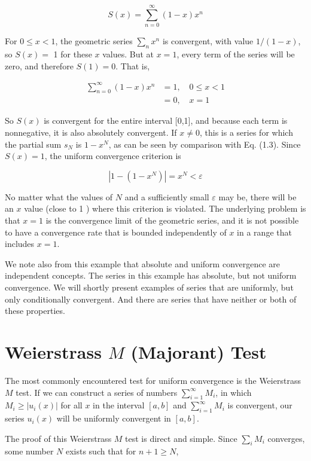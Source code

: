 \documentclass[10pt]{article}
\begin{document}
$$
S(x)=\sum_{n=0}^{\infty}(1-x) x^{n}
$$

For $0 \leq x<1$, the geometric series $\sum_{n} x^{n}$ is convergent, with value $1 /(1-x)$, so $S(x)=$ 1 for these $x$ values. But at $x=1$, every term of the series will be zero, and therefore $S(1)=0$. That is,


\begin{align*}
\sum_{n=0}^{\infty}(1-x) x^{n} & =1, \quad 0 \leq x<1 \\
& =0, \quad x=1 \tag{1.35}
\end{align*}


So $S(x)$ is convergent for the entire interval [0,1], and because each term is nonnegative, it is also absolutely convergent. If $x \neq 0$, this is a series for which the partial sum $s_{N}$ is $1-x^{N}$, as can be seen by comparison with Eq. (1.3). Since $S(x)=1$, the uniform convergence criterion is

$$
\left|1-\left(1-x^{N}\right)\right|=x^{N}<\varepsilon
$$

No matter what the values of $N$ and a sufficiently small $\varepsilon$ may be, there will be an $x$ value (close to 1 ) where this criterion is violated. The underlying problem is that $x=1$ is the convergence limit of the geometric series, and it is not possible to have a convergence rate that is bounded independently of $x$ in a range that includes $x=1$.

We note also from this example that absolute and uniform convergence are independent concepts. The series in this example has absolute, but not uniform convergence. We will shortly present examples of series that are uniformly, but only conditionally convergent. And there are series that have neither or both of these properties.

\section*{Weierstrass $M$ (Majorant) Test}
The most commonly encountered test for uniform convergence is the Weierstrass $M$ test. If we can construct a series of numbers $\sum_{i=1}^{\infty} M_{i}$, in which $M_{i} \geq\left|u_{i}(x)\right|$ for all $x$ in the interval $[a, b]$ and $\sum_{i=1}^{\infty} M_{i}$ is convergent, our series $u_{i}(x)$ will be uniformly convergent in $[a, b]$.

The proof of this Weierstrass $M$ test is direct and simple. Since $\sum_{i} M_{i}$ converges, some number $N$ exists such that for $n+1 \geq N$,
\end{document}
